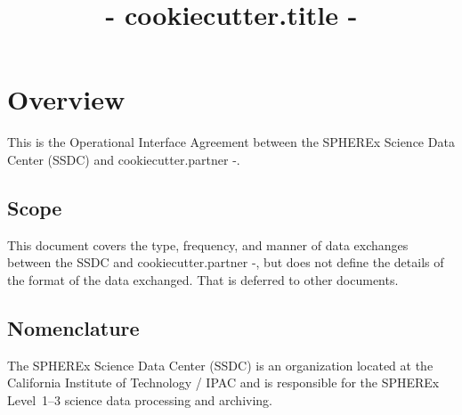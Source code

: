 \documentclass[IF]{spherex}
\title{ {{- cookiecutter.title -}} }
\begin{document}
\maketitle

\begin{dochistory}
\end{dochistory}


\section{Overview}

This is the Operational Interface Agreement between the SPHEREx Science Data Center (SSDC)
and {{ cookiecutter.partner -}}.

\subsection{Scope}


This document covers the type, frequency, and manner of data exchanges between
the SSDC and {{ cookiecutter.partner -}}, but does not define the details of
the format of the data exchanged.
That is deferred to other documents.


\subsection{Nomenclature}

The SPHEREx Science Data Center (SSDC) is an organization located at
the California Institute of Technology / IPAC and is responsible for the
SPHEREx Level~1--3 science data processing and archiving.

\end{document}
